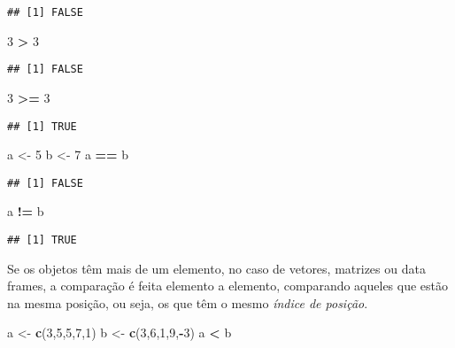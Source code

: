 \documentclass[
]{book}
\newenvironment{Shaded}{\begin{snugshade}}{\end{snugshade}}
\newcommand{\DecValTok}[1]{\textcolor[rgb]{0.00,0.00,0.81}{#1}}
\newcommand{\KeywordTok}[1]{\textcolor[rgb]{0.13,0.29,0.53}{\textbf{#1}}}
\newcommand{\NormalTok}[1]{#1}
\newcommand{\OperatorTok}[1]{\textcolor[rgb]{0.81,0.36,0.00}{\textbf{#1}}}
\newcommand{\StringTok}[1]{\textcolor[rgb]{0.31,0.60,0.02}{#1}}
\begin{document}
\begin{verbatim}
## [1] FALSE
\end{verbatim}

\begin{Shaded}
\begin{Highlighting}[]
\DecValTok{3} \OperatorTok{>}\StringTok{ }\DecValTok{3}
\end{Highlighting}
\end{Shaded}

\begin{verbatim}
## [1] FALSE
\end{verbatim}

\begin{Shaded}
\begin{Highlighting}[]
\DecValTok{3} \OperatorTok{>=}\StringTok{ }\DecValTok{3}
\end{Highlighting}
\end{Shaded}

\begin{verbatim}
## [1] TRUE
\end{verbatim}

\begin{Shaded}
\begin{Highlighting}[]
\NormalTok{a <-}\StringTok{ }\DecValTok{5}
\NormalTok{b <-}\StringTok{ }\DecValTok{7}
\NormalTok{a }\OperatorTok{==}\StringTok{ }\NormalTok{b}
\end{Highlighting}
\end{Shaded}

\begin{verbatim}
## [1] FALSE
\end{verbatim}

\begin{Shaded}
\begin{Highlighting}[]
\NormalTok{a }\OperatorTok{!=}\StringTok{ }\NormalTok{b}
\end{Highlighting}
\end{Shaded}

\begin{verbatim}
## [1] TRUE
\end{verbatim}

Se os objetos têm mais de um elemento, no caso de vetores, matrizes ou data frames, a comparação é feita elemento a elemento, comparando aqueles que estão na mesma posição, ou seja, os que têm o mesmo \emph{índice de posição}.

\begin{Shaded}
\begin{Highlighting}[]
\NormalTok{a <-}\StringTok{ }\KeywordTok{c}\NormalTok{(}\DecValTok{3}\NormalTok{,}\DecValTok{5}\NormalTok{,}\DecValTok{5}\NormalTok{,}\DecValTok{7}\NormalTok{,}\DecValTok{1}\NormalTok{)}
\NormalTok{b <-}\StringTok{ }\KeywordTok{c}\NormalTok{(}\DecValTok{3}\NormalTok{,}\DecValTok{6}\NormalTok{,}\DecValTok{1}\NormalTok{,}\DecValTok{9}\NormalTok{,}\OperatorTok{-}\DecValTok{3}\NormalTok{)}
\NormalTok{a }\OperatorTok{<}\StringTok{ }\NormalTok{b}
\end{Highlighting}
\end{Shaded}
\end{document}

